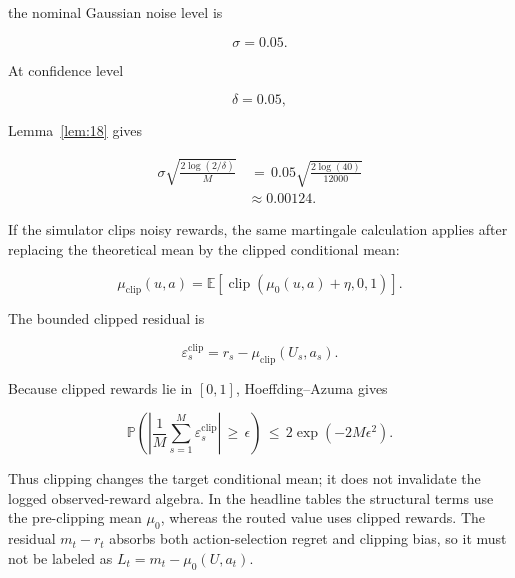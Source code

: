 \documentclass{article} %
\begin{document}
the nominal Gaussian noise level is

\begin{equation}
\label{eq:app-six-noise-example-sigma}
\sigma=0.05.
\end{equation}

At confidence level

\begin{equation}
\label{eq:app-six-noise-example-delta}
\delta=0.05,
\end{equation}

Lemma~\ref{lem:18} gives

\begin{align}
\label{eq:app-six-noise-example-radius}
\sigma\sqrt{\frac{2\log(2/\delta)}{M}}
&\,=\,
0.05\sqrt{\frac{2\log(40)}{12000}}
\\
&\approx
0.00124.
\end{align}

If the simulator clips noisy rewards, the same martingale calculation applies after replacing the theoretical mean by the clipped conditional mean:

\begin{equation}
\label{eq:app-six-clipped-mean}
\mu_{\mathrm{clip}}(u,a)
=
\mathbb{E}\!\left[
\operatorname{clip}\!\left(\mu_0(u,a)+\eta,0,1\right)
\right].
\end{equation}

The bounded clipped residual is

\begin{equation}
\label{eq:app-six-clipped-residual}
\varepsilon^{\mathrm{clip}}_s
=
r_s-\mu_{\mathrm{clip}}(U_s,a_s).
\end{equation}

Because clipped rewards lie in \([0,1]\), Hoeffding--Azuma gives

\begin{equation}
\label{eq:app-six-clipped-tail}
\mathbb{P}\!\left(
\left|
\frac{1}{M}\sum_{s=1}^{M}\varepsilon^{\mathrm{clip}}_s
\right|
\,\ge\,
\epsilon
\right)
\,\le\,
2\exp(-2M\epsilon^2).
\end{equation}

Thus clipping changes the target conditional mean; it does not invalidate the
logged observed-reward algebra. In the headline tables the structural terms use
the pre-clipping mean \(\mu_0\), whereas the routed value uses clipped rewards.
The residual \(m_t-r_t\) absorbs both action-selection regret and clipping
bias, so it must not be labeled as \(L_t=m_t-\mu_0(U,a_t)\).
\end{document}
